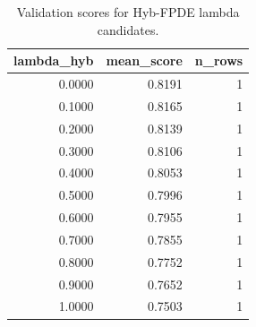 \begin{table}[t]
\caption{Validation scores for Hyb-FPDE lambda candidates.}
\label{tab:lambda_distribution_computed}
\centering
\begin{tabular}{rrr}
\toprule
lambda\_hyb & mean\_score & n\_rows \\
\midrule
0.0000 & 0.8191 & 1 \\
0.1000 & 0.8165 & 1 \\
0.2000 & 0.8139 & 1 \\
0.3000 & 0.8106 & 1 \\
0.4000 & 0.8053 & 1 \\
0.5000 & 0.7996 & 1 \\
0.6000 & 0.7955 & 1 \\
0.7000 & 0.7855 & 1 \\
0.8000 & 0.7752 & 1 \\
0.9000 & 0.7652 & 1 \\
1.0000 & 0.7503 & 1 \\
\bottomrule
\end{tabular}

\end{table}
